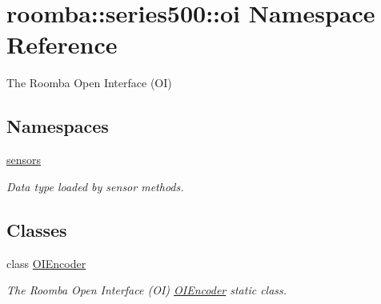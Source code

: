 \hypertarget{namespaceroomba_1_1series500_1_1oi}{\section{roomba\+:\+:series500\+:\+:oi Namespace Reference}
\label{namespaceroomba_1_1series500_1_1oi}
}


The Roomba Open Interface (O\+I)  


\subsection*{Namespaces}
\begin{DoxyCompactItemize}
\item 
 \hyperlink{namespaceroomba_1_1series500_1_1oi_1_1sensors}{sensors}
\begin{DoxyCompactList}\small\item\em Data type loaded by sensor methods. \end{DoxyCompactList}\end{DoxyCompactItemize}
\subsection*{Classes}
\begin{DoxyCompactItemize}
\item 
class \hyperlink{classroomba_1_1series500_1_1oi_1_1_o_i_encoder}{O\+I\+Encoder}
\begin{DoxyCompactList}\small\item\em The Roomba Open Interface (O\+I) \hyperlink{classroomba_1_1series500_1_1oi_1_1_o_i_encoder}{O\+I\+Encoder} static class. \end{DoxyCompactList}\end{DoxyCompactItemize}
